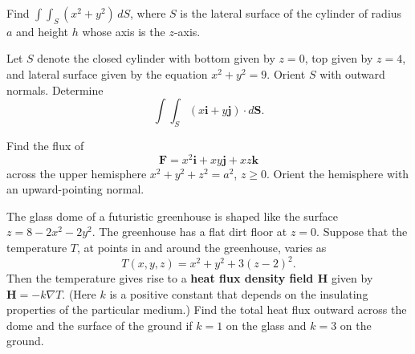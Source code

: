 \documentclass[11pt,letterpaper,boxed]{hmcpset}
\newcommand{\pn}[1]{\left( #1 \right)}
\newcommand{\VEC}[1]{\ensuremath{\mathbf{#1}}\xspace}
\begin{document}
\begin{solution}
\vfill
\end{solution}
\newpage

\begin{problem}[Colley 7.2 \#6]
Find $\int\int_S (x^2+y^2)\,dS$, where $S$ is the lateral surface of the cylinder of radius $a$ and height $h$ whose axis is the $z$-axis.	
\end{problem}

\begin{solution}
\vfill
\end{solution}
\newpage

\begin{problem}[Colley 7.2 \#14]
Let $S$ denote the closed cylinder with bottom given by $z=0$, top given by $z=4$, and lateral surface given by the equation $x^2+y^2=9$. Orient $S$ with
outward normals. Determine
\[
	\int\int_S \pn{x\VEC{i}+y\VEC{j}}\cdot d\VEC{S}.
\]
\end{problem}

\begin{solution}
\vfill
\end{solution}
\newpage

\begin{problem}[Colley 7.2 \#22]
Find the flux of
\[
	\VEC{F} = x^2\VEC{i} + xy\VEC{j}+xz\VEC{k}
\]
across the upper hemisphere $x^2+y^2+z^2=a^2$, $z\geq0$. Orient the hemisphere with an upward-pointing normal.
\end{problem}

\begin{solution}
\vfill
\end{solution}
\newpage

\begin{problem}[Colley 7.2 \#28]
The glass dome of a futuristic greenhouse is shaped like the surface $z=8-2x^2-2y^2$. The greenhouse has a flat dirt floor at $z = 0$. Suppose that the temperature $T$, at points in and around the greenhouse, varies as
\[
	T(x,y,z) = x^2+y^2+3(z-2)^2.
\]
Then the temperature gives rise to a \textbf{heat flux density field H} given by $\VEC{H} = -k\nabla T$. (Here $k$ is a positive constant that depends on the insulating properties of the particular medium.) Find the total heat flux outward across the dome and the surface of the ground if $k = 1$ on the glass and $k = 3$ on the ground.
\end{problem}

\begin{solution}
\vfill
\end{solution}
\newpage
\end{document}
